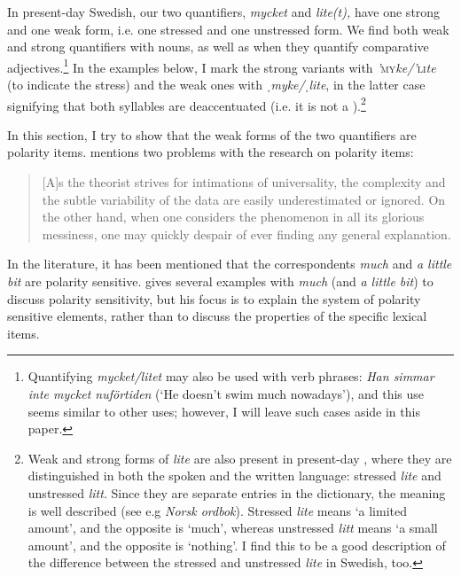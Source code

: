 \documentclass[output=paper]{langscibook}
\begin{document}
In present-day Swedish, our two quantifiers, \textit{mycket} and \textit{lite(t),} have one strong and one weak form, i.e. one stressed and one unstressed form. We find both weak and strong quantifiers with nouns, as well as when they quantify comparative adjectives.\footnote{Quantifying \textit{mycket/litet} may also be used with verb phrases: \textit{Han simmar inte mycket nuförtiden} (‘He doesn’t swim much nowadays’), and this use seems similar to other  uses; however, I will leave such cases aside in this paper.} In the examples below, I mark the strong variants with \textit{’}\textsc{my}\textit{ke/’}\textsc{li}\textit{te} (to indicate the stress) and the weak ones with \textit{ˌmyke/ˌlite}, in the latter case signifying that both syllables are deaccentuated (i.e. it is not a ).\footnote{Weak and strong forms of \textit{lite} are also present in present-day , where they are distinguished in both the spoken and the written language: stressed \textit{lite} and unstressed \textit{litt}. Since they are separate entries in the dictionary, the meaning is well described (see e.g \textit{Norsk ordbok}). Stressed \textit{lite} means ‘a limited amount’, and the opposite is ‘much’, whereas unstressed \textit{litt} means ‘a small amount’, and the opposite is ‘nothing’. I find this to be a good description of the difference between the stressed and unstressed \textit{lite} in Swedish, too.} 



In this section, I try to show that the weak forms of the two quantifiers are polarity items. \citet{Israel1996} mentions two problems with the research on polarity items:

\begin{quote}
[A]s the theorist strives for intimations of universality, the complexity and the subtle variability of the data are easily underestimated or ignored. On the other hand, when one considers the phenomenon in all its glorious messiness, one may quickly despair of ever finding any general explanation. \citep[619]{Israel1996}
\end{quote}

In the literature, it has been mentioned that the  correspondents \textit{much} and \textit{a little bit} are polarity sensitive. \citet{Israel1996} gives several examples with \textit{much} (and \textit{a little bit}) to discuss polarity sensitivity, but his focus is to explain the system of polarity sensitive elements, rather than to discuss the properties of the specific lexical items.
\end{document}
